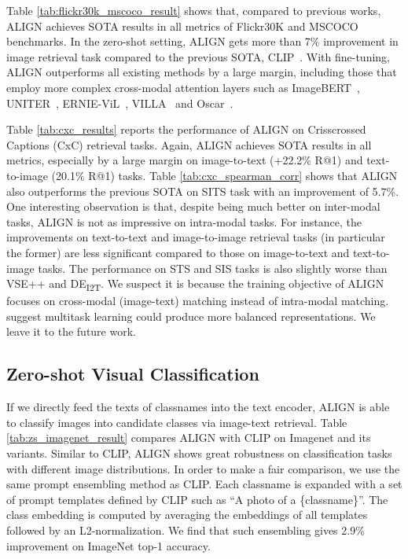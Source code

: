 \documentclass{article}
\begin{document}
Table \ref{tab:flickr30k_mscoco_result} shows that, compared to previous works, ALIGN achieves SOTA results in all metrics of Flickr30K and MSCOCO benchmarks. In the zero-shot setting, ALIGN gets more than 7\% improvement in image retrieval task compared to the previous SOTA, CLIP~\cite{radford:clip}. With fine-tuning, ALIGN outperforms all existing methods by a large margin, including those that employ more complex cross-modal attention layers such as ImageBERT~\cite{qi:imagebert}, UNITER~\cite{chen:uniter}, ERNIE-ViL~\cite{yu:ernie-vil}, VILLA~\cite{gan:villa} and Oscar~\cite{li:oscar}.


Table \ref{tab:cxc_results} reports the performance of ALIGN on Crisscrossed Captions (CxC) retrieval tasks. Again, ALIGN achieves  SOTA results in all metrics, especially by a large margin on image-to-text (+22.2\% R@1) and text-to-image (20.1\% R@1) tasks.
Table \ref{tab:cxc_spearman_corr} shows that ALIGN also outperforms the previous SOTA on SITS task with an improvement of 5.7\%.
One interesting observation is that, despite being much better on inter-modal tasks, ALIGN is not as impressive on intra-modal tasks.
For instance, the improvements on text-to-text and image-to-image retrieval tasks (in particular the former) are less significant compared to those on image-to-text and text-to-image tasks.
The performance on STS and SIS tasks is also slightly worse than VSE++ and DE\textsubscript{I2T}. 
We suspect it is because the training objective of ALIGN focuses on cross-modal (image-text) matching instead of intra-modal matching.
\citet{parekh:cxc} suggest multitask learning could produce more balanced representations.
We leave it to the future work.

\vspace{-2mm}

\subsection{Zero-shot Visual Classification}

If we directly feed the texts of classnames into the text encoder, ALIGN is able to classify images into candidate classes via image-text retrieval. Table \ref{tab:zs_imagenet_result} compares ALIGN with CLIP on Imagenet and its variants. Similar to CLIP, ALIGN shows great robustness on classification tasks with different image distributions. In order to make a fair comparison, we use the same prompt ensembling method as CLIP. Each classname is expanded with a set of prompt templates defined by CLIP such as ``A photo of a \{classname\}''. The class embedding is computed by averaging the embeddings of all templates followed by an L2-normalization. We find that such ensembling gives 2.9\% improvement on ImageNet top-1 accuracy.
\end{document}
